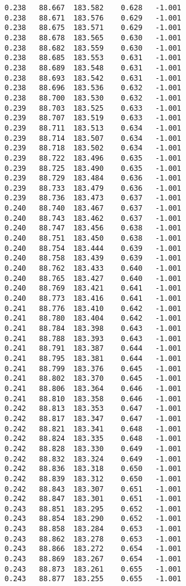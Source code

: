 \begin{verbatim}
   0.238   88.667  183.582    0.628   -1.001
   0.238   88.671  183.576    0.629   -1.001
   0.238   88.675  183.571    0.629   -1.001
   0.238   88.678  183.565    0.630   -1.001
   0.238   88.682  183.559    0.630   -1.001
   0.238   88.685  183.553    0.631   -1.001
   0.238   88.689  183.548    0.631   -1.001
   0.238   88.693  183.542    0.631   -1.001
   0.238   88.696  183.536    0.632   -1.001
   0.238   88.700  183.530    0.632   -1.001
   0.239   88.703  183.525    0.633   -1.001
   0.239   88.707  183.519    0.633   -1.001
   0.239   88.711  183.513    0.634   -1.001
   0.239   88.714  183.507    0.634   -1.001
   0.239   88.718  183.502    0.634   -1.001
   0.239   88.722  183.496    0.635   -1.001
   0.239   88.725  183.490    0.635   -1.001
   0.239   88.729  183.484    0.636   -1.001
   0.239   88.733  183.479    0.636   -1.001
   0.239   88.736  183.473    0.637   -1.001
   0.240   88.740  183.467    0.637   -1.001
   0.240   88.743  183.462    0.637   -1.001
   0.240   88.747  183.456    0.638   -1.001
   0.240   88.751  183.450    0.638   -1.001
   0.240   88.754  183.444    0.639   -1.001
   0.240   88.758  183.439    0.639   -1.001
   0.240   88.762  183.433    0.640   -1.001
   0.240   88.765  183.427    0.640   -1.001
   0.240   88.769  183.421    0.641   -1.001
   0.240   88.773  183.416    0.641   -1.001
   0.241   88.776  183.410    0.642   -1.001
   0.241   88.780  183.404    0.642   -1.001
   0.241   88.784  183.398    0.643   -1.001
   0.241   88.788  183.393    0.643   -1.001
   0.241   88.791  183.387    0.644   -1.001
   0.241   88.795  183.381    0.644   -1.001
   0.241   88.799  183.376    0.645   -1.001
   0.241   88.802  183.370    0.645   -1.001
   0.241   88.806  183.364    0.646   -1.001
   0.241   88.810  183.358    0.646   -1.001
   0.242   88.813  183.353    0.647   -1.001
   0.242   88.817  183.347    0.647   -1.001
   0.242   88.821  183.341    0.648   -1.001
   0.242   88.824  183.335    0.648   -1.001
   0.242   88.828  183.330    0.649   -1.001
   0.242   88.832  183.324    0.649   -1.001
   0.242   88.836  183.318    0.650   -1.001
   0.242   88.839  183.312    0.650   -1.001
   0.242   88.843  183.307    0.651   -1.001
   0.242   88.847  183.301    0.651   -1.001
   0.243   88.851  183.295    0.652   -1.001
   0.243   88.854  183.290    0.652   -1.001
   0.243   88.858  183.284    0.653   -1.001
   0.243   88.862  183.278    0.653   -1.001
   0.243   88.866  183.272    0.654   -1.001
   0.243   88.869  183.267    0.654   -1.001
   0.243   88.873  183.261    0.655   -1.001
   0.243   88.877  183.255    0.655   -1.001

\end{verbatim}
